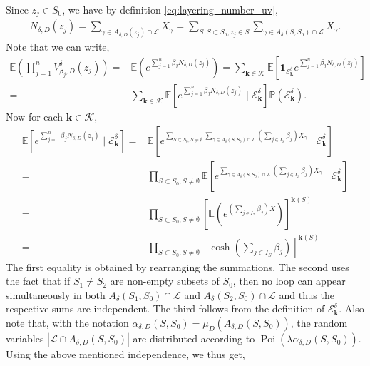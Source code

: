 \documentclass[a4paper, 11pt, reqno]{amsart}
\theoremstyle{definition} \newtheorem{defn}{Definition}[section]
\theoremstyle{remark} \newtheorem{rem}[defn]{Remark}
\theoremstyle{remark} \newtheorem*{rem*}{Remark}
\theoremstyle{plain} \newtheorem{thm}[defn]{Theorem}
\theoremstyle{plain} \newtheorem{lem}[defn]{Lemma}
\theoremstyle{plain} \newtheorem{prop}[defn]{Proposition}
\theoremstyle{plain} \newtheorem{cor}[defn]{Corollary}
\theoremstyle{remark} \newtheorem{exm}[defn]{\textbf{Example}}
\theoremstyle{remark} \newtheorem{exms}[defn]{\textbf{Examples}}
\theoremstyle{remark} \newtheorem*{bl}{}
\numberwithin{equation}{section} %
\newcommand{\mc}{\mathcal}
\newcommand{\pr}{\mathbb{P}}
\newcommand{\E}{\mathbb{E}}
\newcommand{\Poi}{\operatorname{Poi}}
\newcommand{\ind}{\mathbf{1}}
\begin{document}
		Since $z_j \in S_0$, we have by definition \eqref{eq:layering_number_uv},
		\begin{align}
			N_{\delta, D}(z_j) = \sum_{\gamma \in A_{\delta, D}(z_j)\cap \mc{L}} X_{\gamma} = \sum_{S: S \subset S_0, z_j \in S} \sum_{\gamma \in A_{\delta}(S, S_0)\cap \mc{L}} X_{\gamma}.
		\end{align}		
		Note that we can write,
		\begin{align}\label{eq:conv_n_pt_1}
			\E\left(\prod_{j=1}^n V^{\delta}_{\beta_j , D}(z_j)\right) = & \E \left( e^{\sum_{j=1}^n \beta_j N_{\delta, D}(z_j)}\right)	
			= \sum_{\bm{k} \in \mc{K}} \E\left[ \ind_{\mc{E}^{\delta}_{\bm{k}} } e^{\sum_{j=1}^n \beta_j N_{\delta, D}(z_j)} \right]		
			\nonumber \\
			= & \sum_{\bm{k} \in \mc{K}} \E\left[  e^{\sum_{j=1}^n \beta_j N_{\delta, D}(z_j)} \mid \mc{E}^{\delta}_{\bm{k}} \right]	\pr(\mc{E}^{\delta}_{\bm{k}}).		
		\end{align}			
		Now for each $\bm{k} \in \mc{K}$,
		\begin{align}
			\E\left[ e^{\sum_{j=1}^n \beta_j N_{\delta, D}(z_j)} \mid \mc{E}^{\delta}_{\bm{k}} \right]	
			= & \E\left[ e^{\sum_{S\subset S_0, S\neq \emptyset} \sum_{\gamma \in A_{\delta}(S, S_0)\cap \mc{L}} \left(\sum_{j \in I_S} \beta_j\right) X_{\gamma}} \mid \mc{E}^{\delta}_{\bm{k}}\right]
			\nonumber \\
			= & \prod_{S\subset S_0, S\neq \emptyset} \E\left[ e^{ \sum_{\gamma \in A_{\delta}(S, S_0)\cap \mc{L}} \left(\sum_{j \in I_S} \beta_j\right) X_{\gamma} } \mid \mc{E}^{\delta}_{\bm{k}} \right]
			\nonumber \\
			= &  \prod_{S\subset S_0, S\neq \emptyset} \left[\E \left(e^{ \left(\sum_{j \in I_S} \beta_j\right) X} \right) \right]^{\bm{k}(S)}
			\nonumber \\
			= & \prod_{S\subset S_0, S\neq \emptyset} \left[\cosh\left(\sum_{j \in I_S} \beta_j\right)\right]^{\bm{k}(S)}
		\end{align}
		The first equality is obtained by rearranging the summations. The second uses the fact that if $S_1\neq S_2$ are non-empty subsets of $S_0$, then no loop can appear simultaneously in both $A_{\delta}(S_1, S_0)\cap \mc{L}$ and $A_{\delta}(S_2, S_0)\cap \mc{L}$ and thus the respective sums are independent. The third follows from the definition of $\mc{E}^{\delta}_{\bm{k}}$. Also note that, with the notation $\alpha_{\delta, D}(S, S_0) = \mu_D(A_{\delta, D}(S, S_0))$, the random variables $|\mc{L} \cap A_{\delta, D}(S, S_0)|$ are distributed according to $\Poi(\lambda \alpha_{\delta, D}(S,S_0))$. Using the above mentioned independence, we thus get,
\end{document}
